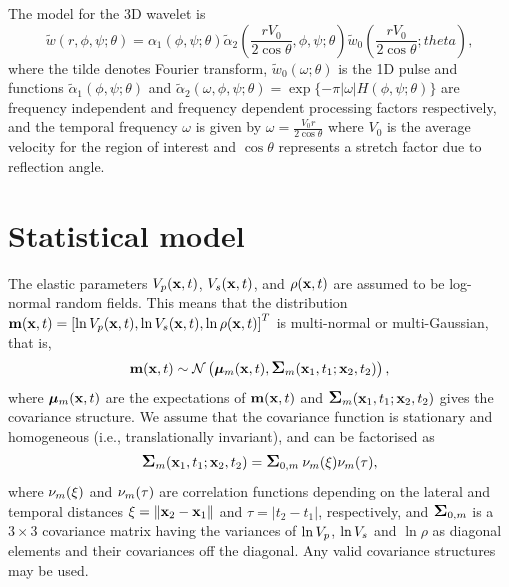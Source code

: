 The model for the 3D wavelet is
\begin{equation}
\tilde{w}(r,\phi,\psi;\theta) = \alpha_1(\phi,\psi;\theta)\tilde{\alpha}_2(\frac{rV_0}{2\cos{\theta}},\phi,\psi;\theta)\tilde{w}_0\left( \frac{rV_0}{2\cos{\theta}};theta\right), \label{eq:waveletform}
\end{equation}
where the tilde denotes Fourier transform, $\tilde{w}_0(\omega;\theta)$ is the 1D pulse and functions $\tilde{\alpha}_1(\phi,\psi;\theta)$ and $\tilde{\alpha}_2(\omega,\phi,\psi;\theta) = \exp\{-\pi |\omega| H(\phi,\psi;\theta)\}$ are frequency independent and frequency dependent processing factors respectively, and the temporal frequency $\omega$ is given by $\omega = \frac{V_0r}{2\cos{\theta}}$ where $V_0$ is the average velocity for the region of interest and $\cos{\theta}$ represents a stretch factor due to reflection angle.


\section{Statistical model}
\label{sec:statmodthe}
The elastic parameters $V_p(\mathbf{x},t)$, $V_s(\mathbf{x},t)$, and
$\rho(\mathbf{x},t)$ are assumed to be log-normal random
fields. This means that the distribution $\mathbf{m}(\mathbf{x},t) =
\left[\ln V_p(\mathbf{x},t),\ln V_s(\mathbf{x},t),\ln\rho(\mathbf{x},t)\right]^T$
is multi-normal or multi-Gaussian, that is,
%
\begin{equation}
  \mathbf{m}(\mathbf{x},t) \sim
  \mathcal{N}\left(\bm\mu_m(\mathbf{x},t),\mbox{\large\ensuremath{\boldsymbol{\Sigma}}}_m(\mathbf{x}_1,t_1;\mathbf{x}_2,t_2)\right),
\label{mdist}
\end{equation}
%
where $\bm\mu_m(\mathbf{x},t)$ are the expectations of
$\mathbf{m}(\mathbf{x},t)$ and $\mbox{\large\ensuremath{\boldsymbol{\Sigma}}}_m(\mathbf{x}_1,t_1;\mathbf{x}_2,t_2)$
gives the covariance structure. We assume that the covariance function
is stationary and homogeneous (i.e., translationally invariant), and
can be factorised as
%
\begin{equation}
  \mbox{\large\ensuremath{\boldsymbol{\Sigma}}}_m(\mathbf{x}_1,t_1;\mathbf{x}_2,t_2)
    = \mbox{\large\ensuremath{\boldsymbol{\Sigma}}}_{0,m} \: \nu_m(\xi) \nu_m(\tau), \label{sigma_m}
\end{equation}
where $\nu_m(\xi)$ and $\nu_m(\tau)$ are correlation functions
depending on the lateral and temporal distances
$\xi = \|\mathbf{x}_2 - \mathbf{x}_1\|$ and $\tau=|t_2-t_1|$,
respectively, and $\mbox{\large\ensuremath{\boldsymbol{\Sigma}}}_{0,m}$ is a $3\times 3$ covariance matrix
having the variances of $\ln V_p$, $\ln V_s$ and $\ln\rho$  as diagonal
elements and their covariances off the diagonal. Any valid covariance
structures may be used.

